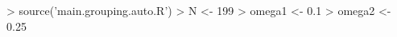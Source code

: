 \begin{CodeChunk}
\begin{CodeInput}


> source('main.grouping.auto.R')
> N <- 199
> omega1 <- 0.1
> omega2 <- 0.25
\end{CodeInput}

\end{CodeChunk}